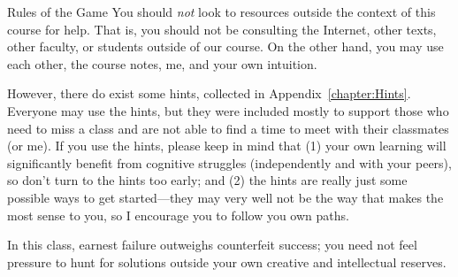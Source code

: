 \begin{section}{Rules of the Game}
You should \emph{not} look to resources outside the context of this course for help. That is, you should not be consulting the Internet, other texts, other faculty, or students outside of our course. On the other hand, you may use each other, the course notes, me, and your own intuition.  

However, there do exist some hints, collected in Appendix~\ref{chapter:Hints}. Everyone may use the hints, but they were included mostly to support those who need to miss a class and are not able to find a time to meet with their classmates (or me). If you use the hints, please keep in mind that (1) your own learning will significantly benefit from cognitive struggles (independently and with your peers), so don't turn to the hints too early; and (2) the hints are really just some possible ways to get started---they may very well not be the way that makes the most sense to you, so I encourage you to follow you own paths. 

In this class, earnest failure outweighs counterfeit success; you need not feel pressure to hunt for solutions outside your own creative and intellectual reserves.  
\end{section}

